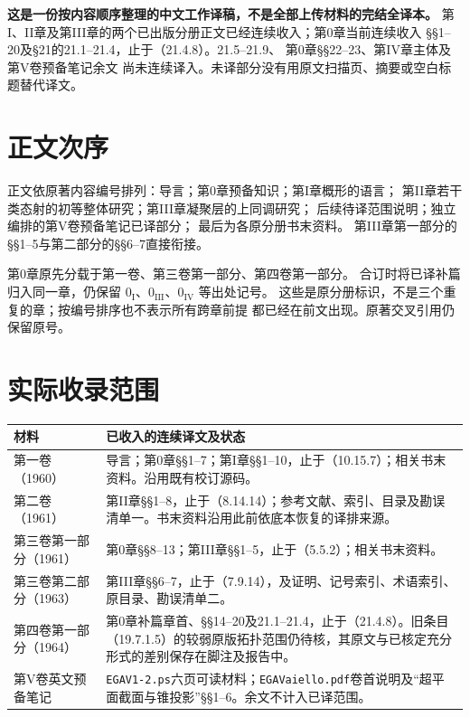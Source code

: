\maketitle
{}
\noindent\textbf{这是一份按内容顺序整理的中文工作译稿，不是全部上传材料的完结全译本。}
第I、II章及第III章的两个已出版分册正文已经连续收入；第0章当前连续收入
§§1--20及§21的21.1--21.4，止于（21.4.8）。21.5--21.9、
第0章§§22--23、第IV章主体及第V卷预备笔记余文
尚未连续译入。未译部分没有用原文扫描页、摘要或空白标题替代译文。

\section*{正文次序}
正文依原著内容编号排列：导言；第0章预备知识；第I章概形的语言；
第II章若干类态射的初等整体研究；第III章凝聚层的上同调研究；
后续待译范围说明；独立编排的第V卷预备笔记已译部分；
最后为各原分册书末资料。
第III章第一部分的§§1--5与第二部分的§§6--7直接衔接。

第0章原先分载于第一卷、第三卷第一部分、第四卷第一部分。
合订时将已译补篇归入同一章，仍保留
$0_{\mathrm I}$、$0_{\mathrm{III}}$、$0_{\mathrm{IV}}$ 等出处记号。
这些是原分册标识，不是三个重复的章；按编号排序也不表示所有跨章前提
都已经在前文出现。原著交叉引用仍保留原号。

\section*{实际收录范围}
\begin{longtable}{@{}p{.25\linewidth}p{.67\linewidth}@{}}
\toprule 材料&已收入的连续译文及状态\\\midrule\endhead
第一卷（1960）&导言；第0章§§1--7；第I章§§1--10，止于（10.15.7）；相关书末资料。沿用既有校订源码。\\
第二卷（1961）&第II章§§1--8，止于（8.14.14）；参考文献、索引、目录及勘误清单一。书末资料沿用此前依底本恢复的译排来源。\\
第三卷第一部分（1961）&第0章§§8--13；第III章§§1--5，止于（5.5.2）；相关书末资料。\\
第三卷第二部分（1963）&第III章§§6--7，止于（7.9.14），及证明、记号索引、术语索引、原目录、勘误清单二。\\
第四卷第一部分（1964）&第0章补篇章首、§§14--20及21.1--21.4，止于（21.4.8）。旧条目（19.7.1.5）的较弱原版拓扑范围仍待核，其原文与已核定充分形式的差别保存在脚注及报告中。\\
第V卷英文预备笔记&\texttt{EGAV1-2.ps}六页可读材料；\texttt{EGAVaiello.pdf}卷首说明及“超平面截面与锥投影”§§1--6。余文不计入已译范围。\\
\bottomrule
\end{longtable}

